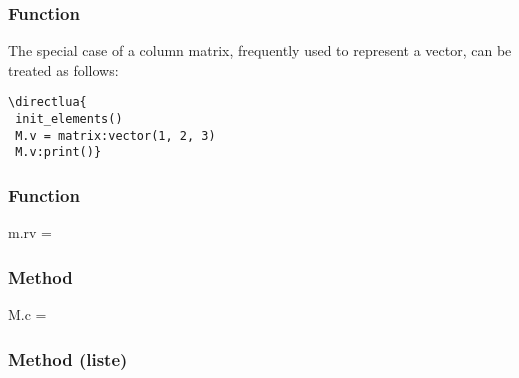 \subsubsection{Function } %
\label{ssub:method_vector}

The special case of a column matrix, frequently used to represent a vector, can be treated as follows:

\vspace{.5em}
\begin{minipage}{.5\textwidth}
\begin{verbatim}
\directlua{
 init_elements()
 M.v = matrix:vector(1, 2, 3)
 M.v:print()}
  \end{verbatim}
\end{minipage}
\begin{minipage}{.5\textwidth}
\end{minipage}

\subsubsection{Function } %
\label{ssub:function_row_vector}

\begin{mybox}

m.rv = 
\end{mybox}


\subsubsection{Method } %
\label{ssub:function_matrix_create_n_m}

\begin{mybox}

M.c = 
\end{mybox}


\subsubsection{Method (liste)} %
\label{ssub:method_square}

